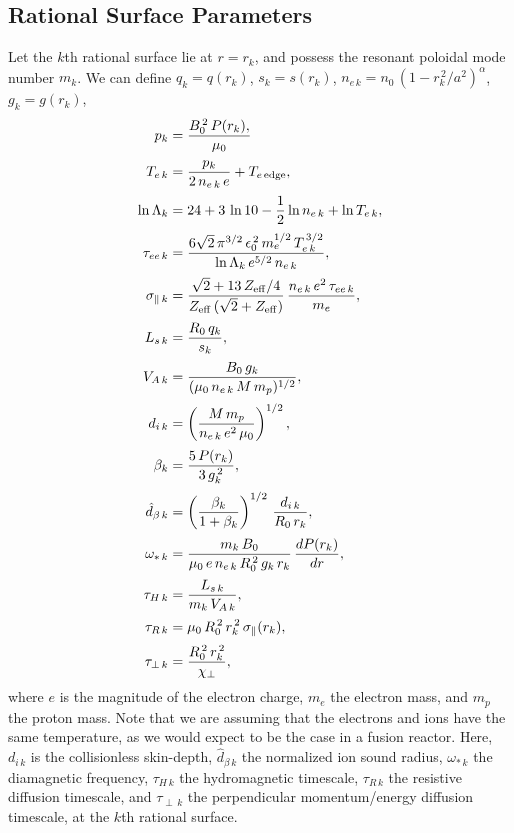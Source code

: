 \documentclass[12pt,prb,aps]{revtex4-1}
\begin{document}
\subsection{Rational Surface Parameters}
Let the $k$th rational surface  lie at $r=r_k$, and possess the resonant poloidal mode number $m_k$. 
We can define  $q_k = q(r_k)$,  $s_k= s(r_k)$, 
$n_{e\,k} = n_0\,(1-r_k^{\,2}/a^2)^\alpha$, $g_k = g(r_k)$, 
\begin{align}
p_k &= \frac{B_0^{\,2}\,P(r_k),}{\mu_0}\\[0.5ex]
T_{e\,k} &= \frac{p_k}{2\,n_{e\,k}\,e} + T_{e\,{\rm edge}},\\[0.5ex]
\ln{\Lambda}_k &= 24 + 3\,\ln 10-\frac{1}{2}\ln n_{e\,k} + \ln T_{e\,k},\\[0.5ex]
\tau_{ee\,k}&= \frac{6\sqrt{2}\,\pi^{3/2}\,\epsilon_0^{\,2}\,m_e^{1/2}\,T_{e\,k}^{\,3/2}}{\ln{\Lambda}_k\,e^{5/2}\,n_{e\,k}},\\[0.5ex]
\sigma_{\parallel\,k} &= \frac{\sqrt{2}+13\,Z_{\rm eff}/4}{Z_{\rm eff}\,(\sqrt{2}+Z_{\rm eff})}\,\frac{n_{e\,k}\,e^2\,\tau_{ee\,k}}{m_e},\\[0.5ex]
L_{s\,k} &= \frac{R_0\,q_k}{s_k},\\[0.5ex]
V_{A\,k} &= \frac{B_0\,g_k}{(\mu_0\,n_{e\,k}\,M\,m_p)^{1/2}},\\[0.5ex]
d_{i\,k} &= \left(\frac{M\,m_p}{n_{e\,k}\,e^2\,\mu_0}\right)^{1/2},\\[0.5ex]
\beta_k &= \frac{5\,P(r_k)}{3\,g_k^{\,2}},\\[0.5ex]
\hat{d}_{\beta\,k} &= \left(\frac{\beta_k}{1+\beta_k}\right)^{1/2}\,\frac{d_{i\,k}}{R_0\,r_k},\\[0.5ex]
\omega_{\ast\,k} &= \frac{m_k\,B_0}{\mu_0\,e\,n_{e\,k}\,R_0^{\,2}\,g_k\,r_k}\,\frac{dP(r_k)}{dr}, \\[0.5ex]
\tau_{H\,k} &= \frac{L_{s\,k}}{m_k\,V_{A\,k}},\\[0.5ex]
\tau_{R\,k} &= \mu_0\,R_0^{\,2}\,r_k^{\,2}\,\sigma_\parallel(r_k),\\[0.5ex]
\tau_{\perp\,k} &= \frac{R_0^{\,2}\,r_k^{\,2}}{\chi_\perp},
\end{align}
where $e$ is the magnitude of the electron charge, $m_e$ the electron mass, and $m_p$ the proton mass. 
Note that we are assuming that the electrons and ions have the same temperature, as we would expect to be the case in a fusion reactor. 
Here, $d_{i\,k}$ is the collisionless skin-depth, $\hat{d}_{\beta\,k}$ the normalized ion sound radius, $\omega_{\ast\,k}$ the diamagnetic frequency, 
$\tau_{H\,k}$ the hydromagnetic timescale, $\tau_{R\,k}$ the resistive diffusion timescale, and $\tau_{\perp\,k}$ the perpendicular momentum/energy diffusion timescale,
at the $k$th rational surface. 
\end{document}
